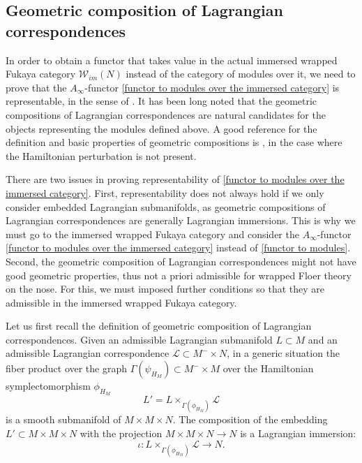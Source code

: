 \documentclass{amsart}
\numberwithin{equation}{section}
\numberwithin{figure}{section}
\begin{document}
\subsection{Geometric composition of Lagrangian correspondences}\label{geometric composition admissible for wrapped Floer theory}
	In order to obtain a functor that takes value in the actual immersed wrapped Fukaya category $\mathcal{W}_{im}(N)$ instead of the category of modules over it, we need to prove that the $A_{\infty}$-functor \eqref{functor to modules over the immersed category} is representable, in the sense of \cite{Fukaya1}. It has been long noted that the geometric compositions of Lagrangian correspondences are natural candidates for the objects representing the modules defined above. A good reference for the definition and basic properties of geometric compositions is \cite{Wehrheim-Woodward4}, in the case where the Hamiltonian perturbation is not present. \par 
	There are two issues in proving representability of \eqref{functor to modules over the immersed category}. First, representability does not always hold if we only consider embedded Lagrangian submanifolds, as geometric compositions of Lagrangian correspondences are generally Lagrangian immersions. This is why we must go to the immersed wrapped Fukaya category and consider the $A_{\infty}$-functor \eqref{functor to modules over the immersed category} instead of \eqref{functor to modules}. Second, the geometric composition of Lagrangian correspondences might not have good geometric properties, thus not a priori admissible for wrapped Floer theory on the nose. For this, we must imposed further conditions so that they are admissible in the immersed wrapped Fukaya category. \par
	Let us first recall the definition of geometric composition of Lagrangian correspondences. Given an admissible Lagrangian submanifold $L \subset M$ and an admissible Lagrangian correspondence $\mathcal{L} \subset M^{-} \times N$, in a generic situation the fiber product over the graph $\Gamma(\psi_{H_{M}}) \subset M^{-} \times M$ over the Hamiltonian symplectomorphism $\phi_{H_{M}}$
\begin{equation*}
L' = L \times_{\Gamma(\phi_{H_{M}})} \mathcal{L}
\end{equation*}
is a smooth submanifold of $M \times M \times N$. The composition of the embedding $L' \subset M \times M \times N$ with the projection $M \times M \times N \to N$ is a Lagrangian immersion:
\begin{equation*}
\iota: L \times_{\Gamma(\phi_{H_{M}})} \mathcal{L} \to N.
\end{equation*}
\end{document}
